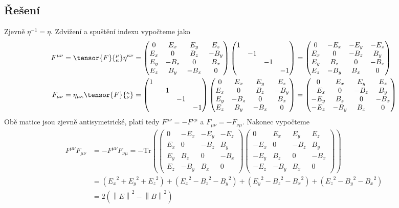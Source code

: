 \documentclass[]{article}
\newcommand{\mat}[1]{\begin{pmatrix}#1\end{pmatrix}}
\newcommand{\norm}[1]{\left\lVert#1\right\rVert}
\begin{document}
\subsection{Řešení}
Zjevně $\eta^{-1} = \eta$. Zdvižení a spuštění indexu vypočteme jako
\begin{align*}
    F^{\mu\nu} &= \tensor{F}{^\mu_\kappa} \eta^{\kappa\nu} = \mat{
        0 & E_x & E_y & E_z \\
        E_x & 0 & B_z & -B_y \\
        E_y & -B_z & 0 & B_x \\
        E_z & B_y & -B_x & 0
    } \mat{1 &&&\\ & -1 &&\\ && -1 &\\ &&& -1}
    = \mat{
        0 & -E_x & -E_y & -E_z \\
        E_x & 0 & -B_z & B_y \\
        E_y & B_z & 0 & -B_x \\
        E_z & -B_y & B_x & 0
    } \\
    F_{\mu\nu} &= \eta_{\mu\kappa} \tensor{F}{^\kappa_\nu}  =
    \mat{1 &&&\\ & -1 &&\\ && -1 &\\ &&& -1}
    \mat{
        0 & E_x & E_y & E_z \\
        E_x & 0 & B_z & -B_y \\
        E_y & -B_z & 0 & B_x \\
        E_z & B_y & -B_x & 0
    }
    = \mat{
        0 & E_x & E_y & E_z \\
        -E_x & 0 & -B_z & B_y \\
        -E_y & B_z & 0 & -B_x \\
        -E_z & -B_y & B_x & 0
    }
\end{align*}
Obě matice jsou zjevně antisymetrické, platí tedy $F^{\mu\nu} = -F^{\nu\mu}$ a $F_{\mu\nu} = -F_{\nu\mu}$. Nakonec vypočteme
\begin{align*}
    F^{\mu\nu} F_{\mu\nu}
    &= -F^{\mu\nu}F_{\nu\mu}
    = -\mathrm{Tr}(
        \mat{
            0 & -E_x & -E_y & -E_z \\
            E_x & 0 & -B_z & B_y \\
            E_y & B_z & 0 & -B_x \\
            E_z & -B_y & B_x & 0
        }
        \mat{
            0 & E_x & E_y & E_z \\
            -E_x & 0 & -B_z & B_y \\
            -E_y & B_z & 0 & -B_x \\
            -E_z & -B_y & B_x & 0
        }
    ) \\
    &= ({E_x}^2 + {E_y}^2 + {E_z}^2) + ({E_x}^2 - {B_z}^2 - {B_y}^2) + ({E_y}^2 - {B_z}^2 - {B_x}^2) + ({E_z}^2 - {B_y}^2 - {B_x}^2) \\
    &= 2 \left( \norm{E}^2 - \norm{B}^2 \right)
\end{align*}
\end{document}
